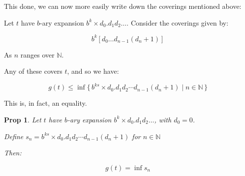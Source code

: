 \documentclass[11pt, reqno]{amsart}
\newcommand{\N}{\mathbb{N}}
\newtheorem{prop}{Prop}
\begin{document}
This done, we can now more easily write down the coverings mentioned above:

Let $t$ have $b$-ary expansion $b^k \times d_0 . d_1 d_2 \dots$. Consider the coverings given by:

\[ b^k [d_0 \dots d_{n-1} (d_n + 1)] \]

As $n$ ranges over $\N$.

Any of these covers $t$, and so we have:

\[ g(t) \leq \inf \{\, b^{ks} \times d_0 . d_1 d_2 \cdots d_{n-1} (d_n + 1) \mid n \in \N\,\}\]

This is, in fact, an equality.

\begin{prop} \label{ginfs}
Let $t$ have $b$-ary expansion $b^k \times d_0 . d_1 d_2 \dots$, with $d_0 = 0$.

Define $s_n = b^{ks} \times d_0 . d_1 d_2 \cdots d_{n-1} (d_n + 1)$ for $n \in \N$

Then:

\[ g(t) = \inf s_n\]
\end{prop}
\end{document}
